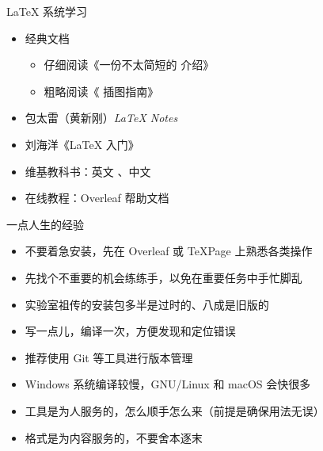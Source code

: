 \begin{frame}{\LaTeX{} 系统学习}
  \begin{itemize}
    \item 经典文档
          \begin{itemize}
            \item 仔细阅读《一份不太简短的 \LaTeXe{} 介绍》
            \item 粗略阅读《\LaTeXe{} 插图指南》
          \end{itemize}
    \item 包太雷（黄新刚）\textit{\LaTeX{} Notes}
    \item 刘海洋《\LaTeX{} 入门》
    \item 维基教科书：英文 、中文 
    \item 在线教程：Overleaf 帮助文档
  \end{itemize}
\end{frame}

\begin{frame}{一点人生的经验}
  \begin{itemize}
    \item 不要着急安装，先在 Overleaf 或 TeXPage 上熟悉各类操作
    \item 先找个不重要的机会练练手，以免在重要任务中手忙脚乱
    \item 实验室祖传的安装包多半是过时的、\hithesis 八成是旧版的
    \item 写一点儿，编译一次，方便发现和定位错误
    \item 推荐使用 Git 等工具进行版本管理
    \item Windows 系统编译较慢，GNU/Linux 和 macOS 会快很多
    \item \alert{工具是为人服务的，怎么顺手怎么来}（前提是确保用法无误）
    \item \alert{格式是为内容服务的，不要舍本逐末}
  \end{itemize}
\end{frame}

